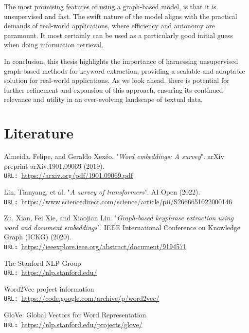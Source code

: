 \documentclass[12pt]{article}
\numberwithin{equation}{section}
\begin{document}
\begin{spacing}{1.5}
	The most promising features of using a graph-based model, is that it is unsupervised and fast. The swift nature of the model aligns with the practical demands of real-world applications, where efficiency and autonomy are paramount. It most certainly can be used as a particularly good initial guess when doing information retrieval. 
	
	In conclusion, this thesis highlights the importance of harnessing unsupervised graph-based methods for keyword extraction, providing a scalable and adaptable solution for real-world applications. As we look ahead, there is potential for further refinement and expansion of this approach, ensuring its continued relevance and utility in an ever-evolving landscape of textual data.
	

	
	
	
	\newpage
	\section{Literature}
	
	\begin{thebibliography}{8}
		Almeida, Felipe, and Geraldo Xexéo. "\textit{Word embeddings: A survey}". arXiv preprint arXiv:1901.09069 (2019). \\
		\texttt{URL: }\url{https://arxiv.org/pdf/1901.09069.pdf}
		
		Lin, Tianyang, et al. "\textit{A survey of transformers}". AI Open (2022).\\
		\texttt{URL: }\url{https://www.sciencedirect.com/science/article/pii/S2666651022000146}
		
		Zu, Xian, Fei Xie, and Xiaojian Liu. "\textit{Graph-based keyphrase extraction using word and document embeddings}". IEEE International Conference on Knowledge Graph (ICKG) (2020). \\
		\texttt{URL: }\url{https://ieeexplore.ieee.org/abstract/document/9194571}
		
		The Stanford NLP Group\\
		\texttt{URL: }\url{https://nlp.stanford.edu/}
		
		Word2Vec project information\\
		\texttt{URL: }\url{https://code.google.com/archive/p/word2vec/}
		
		GloVe: Global Vectors for Word Representation\\
		\texttt{URL: }\url{https://nlp.stanford.edu/projects/glove/}
		

\end{thebibliography}
\end{spacing}
\end{document}
